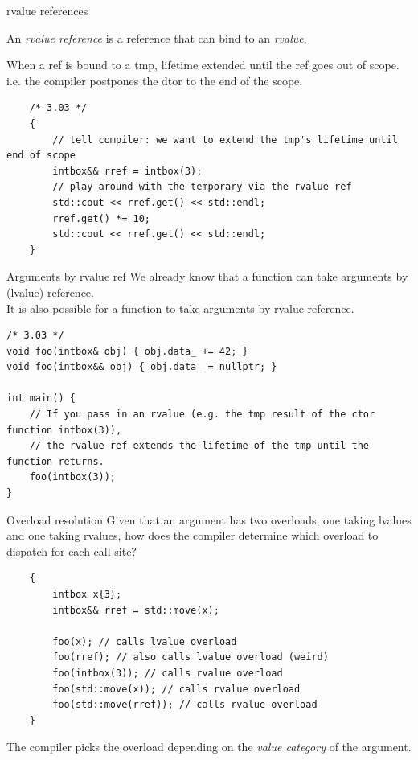 \begin{frame}[fragile]{rvalue references}
  \begin{sqt:definition}
    An \emph{rvalue reference} is a reference that can bind to an \emph{rvalue}.
  \end{sqt:definition}
  \begin{sqt:result}
    When a ref is bound to a tmp, lifetime extended until the ref goes out of scope.\\
    i.e. the compiler postpones the dtor to the end of the scope.
  \end{sqt:result}

  \begin{verbatim}
    /* 3.03 */
    {
        // tell compiler: we want to extend the tmp's lifetime until end of scope
        intbox&& rref = intbox(3);
        // play around with the temporary via the rvalue ref
        std::cout << rref.get() << std::endl;
        rref.get() *= 10;
        std::cout << rref.get() << std::endl;
    }
  \end{verbatim}
\end{frame}

\begin{frame}[fragile]{Arguments by rvalue ref}
  We already know that a function can take arguments by (lvalue) reference.\\
  It is also possible for a function to take arguments by rvalue reference.

  \begin{verbatim}
/* 3.03 */
void foo(intbox& obj) { obj.data_ += 42; }
void foo(intbox&& obj) { obj.data_ = nullptr; }

int main() {
    // If you pass in an rvalue (e.g. the tmp result of the ctor function intbox(3)),
    // the rvalue ref extends the lifetime of the tmp until the function returns.
    foo(intbox(3));
}
  \end{verbatim}
\end{frame}

\begin{frame}[fragile]{Overload resolution}
  Given that an argument has two overloads, one taking lvalues and one taking rvalues,
  how does the compiler determine which overload to dispatch for each call-site?

  \begin{verbatim}
    {
        intbox x{3};
        intbox&& rref = std::move(x);

        foo(x); // calls lvalue overload
        foo(rref); // also calls lvalue overload (weird)
        foo(intbox(3)); // calls rvalue overload
        foo(std::move(x)); // calls rvalue overload
        foo(std::move(rref)); // calls rvalue overload
    }
  \end{verbatim}

  \begin{sqt:result}
    The compiler picks the overload depending on the \emph{value category} of the argument.
  \end{sqt:result}
\end{frame}

